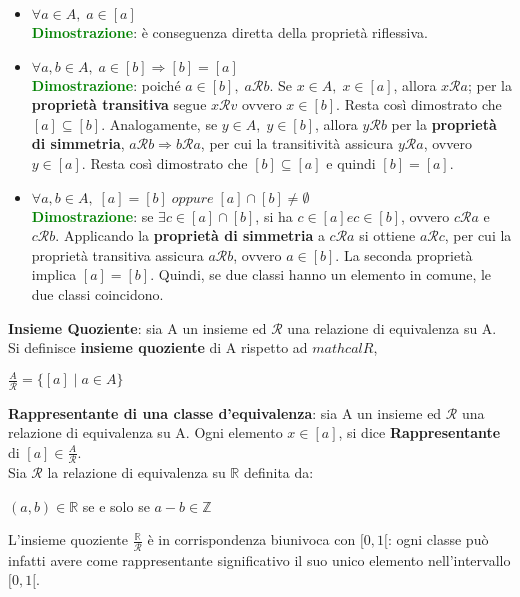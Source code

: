 \begin{itemize}
    \item $\forall a \in A, \; a \in [a]$ \\
          \textcolor{green}{\textbf{Dimostrazione}}: è conseguenza diretta della proprietà riflessiva.
    \item $\forall a,b \in A, \; a \in [b] \Rightarrow [b] = [a]$ \\
          \textcolor{green}{\textbf{Dimostrazione}}: poiché $a \in [b], \; a\mathcal{R}b$. Se $x \in A, \; x \in [a]$, allora $x\mathcal{R}a$; per la \textbf{proprietà transitiva} segue $x\mathcal{R}v$ ovvero $x \in [b]$. Resta così dimostrato che $[a] \subseteq [b]$. Analogamente, se $y \in A, \; y \in [b]$, allora $y\mathcal{R}b$ per la \textbf{proprietà di simmetria}, $a\mathcal{R}b \Rightarrow b\mathcal{R}a$, per cui la transitività assicura $y\mathcal{R}a$, ovvero $y \in [a]$. Resta così dimostrato che $[b] \subseteq [a]$ e quindi $[b] = [a]$.
    \item $\forall a,b \in A, \; [a] = [b] \; oppure \; [a] \cap [b] \neq \emptyset$ \\
          \textcolor{green}{\textbf{Dimostrazione}}: se $\exists c \in [a] \cap [b]$, si ha $c \in [a] e c \in [b]$, ovvero $c\mathcal{R}a$ e $c\mathcal{R}b$. Applicando la \textbf{proprietà di simmetria} a $c\mathcal{R}a$ si ottiene $a\mathcal{R}c$, per cui la proprietà transitiva assicura $a\mathcal{R}b$, ovvero $a \in [b]$. La seconda proprietà implica $[a] = [b]$. Quindi, se due classi hanno un elemento in comune, le due classi coincidono.
\end{itemize}
\textbf{Insieme Quoziente}: sia A un insieme ed $\mathcal{R}$ una relazione di equivalenza su A. Si definisce \textbf{insieme quoziente} di A rispetto ad $mathcal{R}$,
\begin{center}
    $\frac{A}{\mathcal{R}} = \{[a] \; | \; a \in A\}$
\end{center}
\textbf{Rappresentante di una classe d'equivalenza}: sia A un insieme ed $\mathcal{R}$ una relazione di equivalenza su A. Ogni elemento $x \in [a]$, si dice \textbf{Rappresentante} di $[a] \in \frac{A}{\mathcal{R}}$. \\
Sia $\mathcal{R}$ la relazione di equivalenza su $\mathbb{R}$ definita da:
\begin{center}
    $(a, b) \in \mathbb{R}$ se e solo se $a - b \in \mathbb{Z}$
\end{center}
L'insieme quoziente $\frac{\mathbb{R}}{\mathcal{R}}$ è in corrispondenza biunivoca con $[0, 1[$: ogni classe può infatti avere come rappresentante significativo il suo unico elemento nell'intervallo $[0, 1[$. \\
